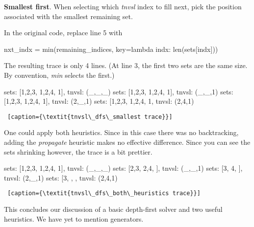 \noindent\textbf{Smallest first}. When selecting which \textit{tnvsl} index to fill next, pick the position associated with the smallest remaining set. 

In the original code, replace line 5 with
\begin{center}
\begin{minipage}[c]{0.45\textwidth}
\begin{python1}
 nxt_indx = min(remaining_indices,
                key=lambda indx: len(sets[indx]))
\end{python1}
\end{minipage}
\end{center}
The resulting trace is only 4 lines. (At line 3, the first two sets are the same size. By convention, \textit{min} selects the first.)

\begin{minipage}[c]{0.45\textwidth}
\begin{python1}  
sets: [{1,2,3}, {1,2,4}, {1}], tnvsl: (_,_,_)
  sets: [{1,2,3}, {1,2,4}, {1}], tnvsl: (_,_,1)
    sets: [{1,2,3}, {1,2,4}, {1}], tnvsl: (2,_,1)
      sets: [{1,2,3}, {1,2,4}, {1}, tnvsl: (2,4,1)
\end{python1}\linv
\begin{lstlisting} [caption={\textit{tnvsl\_dfs\_smallest trace}}]
\end{lstlisting}
\end{minipage}

One could apply both heuristics. Since in this case there was no backtracking, adding the \textit{propagate} heuristic makes no effective difference. Since you can see the sets shrinking however, the trace is a bit prettier.

\begin{minipage}[c]{0.45\textwidth}
\begin{python1} 
sets: [{1,2,3}, {1,2,4}, {1}], tnvsl: (_,_,_)
  sets: [{2,3}, {2,4}, {}], tnvsl: (_,_,1)
    sets: [{3}, {4}, {}], tnvsl: (2,_,1)
      sets: [{3}, {}, {}, tnvsl: (2,4,1)
\end{python1}\linv
\begin{lstlisting} [caption={\textit{tnvsl\_dfs\_both\_heuristics trace}}]
\end{lstlisting}
\end{minipage}

This concludes our discussion of a basic depth-first solver and two useful heuristics. We have yet to mention generators.

